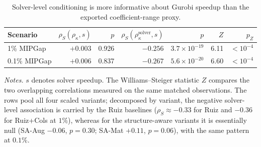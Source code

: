 \documentclass[AMA,Times1COL]{WileyNJDv5} %
\newcommand{\methodAug}{SA-Aug}
\newcommand{\methodMat}{SA-Mat}
\newcommand{\methodRuiz}{Ruiz}
\newcommand{\methodRuizCols}{Ruiz+Cols}
\providecommand{\DIFaddbegin}{} %
\providecommand{\DIFaddend}{} %
\providecommand{\DIFdelbegin}{} %
\providecommand{\DIFdelend}{} %
\begin{document}
\DIFdelbegin %
\DIFdelend \DIFaddbegin \begin{table}[!htbp]
\centering
\caption{Solver-level conditioning is more informative about Gurobi speedup than the exported coefficient-range proxy.}
\label{tab:gurobi-conditioning-correlations}
\small
\begin{tabular}{@{}lrrrrrr@{}}
\toprule
Scenario & $\rho_S(\rho_\kappa,s)$ & $p$ & $\rho_S(\rho_\kappa^{\mathrm{solver}},s)$ & $p$ & $Z$ & $p_Z$ \\
\midrule
1\% MIPGap & $+0.003$ & 0.926 & $-0.256$ & $3.7\times 10^{-19}$ & 6.11 & $<10^{-4}$ \\
0.1\% MIPGap & $+0.006$ & 0.837 & $-0.267$ & $5.6\times 10^{-20}$ & 6.60 & $<10^{-4}$ \\
\bottomrule
\end{tabular}
\begin{flushleft}\footnotesize
\emph{Notes.} $s$ denotes solver speedup. The Williams--Steiger statistic $Z$ compares the
two overlapping correlations measured on the same matched observations. The rows pool all
four scaled variants; decomposed by variant, the negative solver-level association is
carried by the Ruiz baselines ($\rho_S\approx-0.33$ for \methodRuiz{} and $-0.36$ for
\methodRuizCols{} at $1\%$), whereas for the structure-aware variants it is essentially
null (\methodAug{} $-0.06$, $p=0.30$; \methodMat{} $+0.11$, $p=0.06$), with the same
pattern at $0.1\%$.
\end{flushleft}
\end{table}
\DIFaddend 
\end{document}
